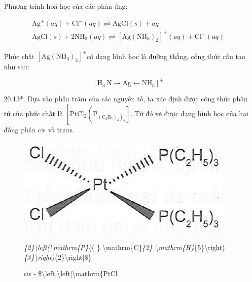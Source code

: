 \documentclass[10pt]{article}
\begin{document}
Phương trình hoá học của các phản ứng:

$$
\begin{gathered}
\mathrm{Ag}^{+}(a q)+\mathrm{Cl}^{-}(a q) \rightleftharpoons \mathrm{AgCl}(s)+a q \\
\mathrm{AgCl}(s)+2 \mathrm{NH}_{3}(a q) \rightleftharpoons\left[\mathrm{Ag}\left(\mathrm{NH}_{3}\right)_{2}\right]^{+}(a q)+\mathrm{Cl}^{-}(a q)
\end{gathered}
$$

Phức chất $\left[\mathrm{Ag}\left(\mathrm{NH}_{3}\right)_{2}\right]^{+}$có dạng hình học là đường thẳng, công thức cấu tạo như sau:

$$
\left[\mathrm{H}_{3} \mathrm{~N} \rightarrow \mathrm{Ag} \leftarrow \mathrm{NH}_{3}\right]^{+}
$$

20.13*. Dựa vào phần trăm của các nguyên tố, ta xác định được công thức phân tử của phức chất là $\left[\mathrm{PtCl}_{2}\left(\mathrm{P}_{\left.\left(\mathrm{C}_{2} \mathrm{H}_{5}\right)_{3}\right)_{2}}\right]\right.$. Từ đó vẽ được dạng hình học của hai đồng phân cis và trans.

\begin{figure}[h]
\begin{center}
  \includegraphics[width=\textwidth]{2025_10_23_b4e16b74380d0f7e7700g-119}
\captionsetup{labelformat=empty}
\caption{cis - \$\textbackslash left.\textbackslash left[\textbackslash mathrm\{PtCl}\textit{\{2\}\textbackslash left(\textbackslash mathrm\{P\}}\{( \} \textbackslash mathrm\{C\}\textit{\{2\} \textbackslash mathrm\{H\}}\{5\}\textbackslash right)\textit{\{3\}\textbackslash right)}\{2\}\textbackslash right]\$\}\end{center}
\end{figure}
\end{document}
